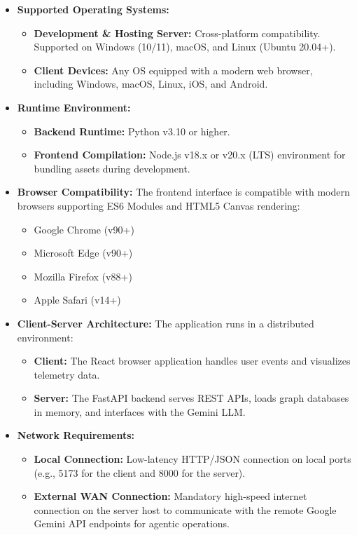 \begin{itemize}
    \item \textbf{Supported Operating Systems:}
    \begin{itemize}
        \item \textbf{Development \& Hosting Server:} Cross-platform compatibility. Supported on Windows (10/11), macOS, and Linux (Ubuntu 20.04+).
        \item \textbf{Client Devices:} Any OS equipped with a modern web browser, including Windows, macOS, Linux, iOS, and Android.
    \end{itemize}
    \item \textbf{Runtime Environment:}
    \begin{itemize}
        \item \textbf{Backend Runtime:} Python v3.10 or higher.
        \item \textbf{Frontend Compilation:} Node.js v18.x or v20.x (LTS) environment for bundling assets during development.
    \end{itemize}
    \item \textbf{Browser Compatibility:} The frontend interface is compatible with modern browsers supporting ES6 Modules and HTML5 Canvas rendering:
    \begin{itemize}
        \item Google Chrome (v90+)
        \item Microsoft Edge (v90+)
        \item Mozilla Firefox (v88+)
        \item Apple Safari (v14+)
    \end{itemize}
    \item \textbf{Client-Server Architecture:} The application runs in a distributed environment:
    \begin{itemize}
        \item \textbf{Client:} The React browser application handles user events and visualizes telemetry data.
        \item \textbf{Server:} The FastAPI backend serves REST APIs, loads graph databases in memory, and interfaces with the Gemini LLM.
    \end{itemize}
    \item \textbf{Network Requirements:}
    \begin{itemize}
        \item \textbf{Local Connection:} Low-latency HTTP/JSON connection on local ports (e.g., 5173 for the client and 8000 for the server).
        \item \textbf{External WAN Connection:} Mandatory high-speed internet connection on the server host to communicate with the remote Google Gemini API endpoints for agentic operations.
    \end{itemize}
\end{itemize}
